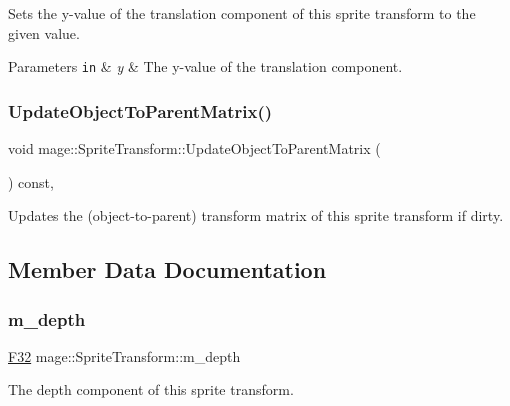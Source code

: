 Sets the y-\/value of the translation component of this sprite transform to the given value.


\begin{DoxyParams}[1]{Parameters}
\mbox{\tt in}  & {\em y} & The y-\/value of the translation component. \\
\hline
\end{DoxyParams}
\hypertarget{classmage_1_1_sprite_transform_a92ae51f7dbf034d119625f70aa7fad1c}{}\label{classmage_1_1_sprite_transform_a92ae51f7dbf034d119625f70aa7fad1c} 
\subsubsection{\texorpdfstring{Update\+Object\+To\+Parent\+Matrix()}{UpdateObjectToParentMatrix()}}
{\footnotesize\ttfamily void mage\+::\+Sprite\+Transform\+::\+Update\+Object\+To\+Parent\+Matrix (\begin{DoxyParamCaption}{ }\end{DoxyParamCaption}) const\hspace{0.3cm}{\ttfamily [private]}, {\ttfamily [noexcept]}}

Updates the (object-\/to-\/parent) transform matrix of this sprite transform if dirty. 

\subsection{Member Data Documentation}
\hypertarget{classmage_1_1_sprite_transform_a646e129b2e9702eec23b4c673f07dfef}{}\label{classmage_1_1_sprite_transform_a646e129b2e9702eec23b4c673f07dfef} 
\subsubsection{\texorpdfstring{m\+\_\+depth}{m\_depth}}
{\footnotesize\ttfamily \hyperlink{namespacemage_aa97e833b45f06d60a0a9c4fc22ae02c0}{F32} mage\+::\+Sprite\+Transform\+::m\+\_\+depth\hspace{0.3cm}{\ttfamily [private]}}

The depth component of this sprite transform. \hypertarget{classmage_1_1_sprite_transform_a3072ed606f16d14d16cdad46438e9cf3}{}\label{classmage_1_1_sprite_transform_a3072ed606f16d14d16cdad46438e9cf3} 
